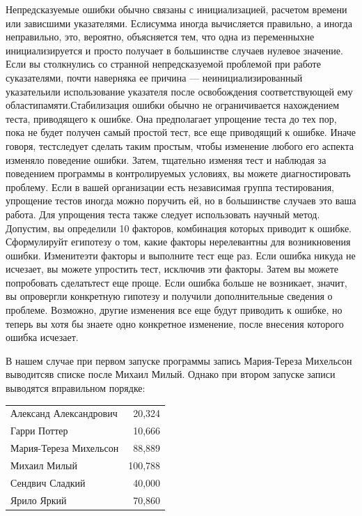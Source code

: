 \documentclass[a4paper]{article}
\begin{document}
Непредсказуемые ошибки обычно связаны с инициализацией,  расчетом  времени  или  зависшими  указателями.  Еслисумма  иногда  вычисляется  правильно,  а  иногда  неправильно, это, вероятно, объясняется тем, что одна из переменныхне  инициализируется  и  просто  получает  в  большинстве  случаев  нулевое  значение.  Если  вы  столкнулись  со  странной  непредсказуемой  проблемой  при  работе  суказателями,  почти  наверняка  ее  причина  —  неинициализированный  указательили  использование  указателя  после  освобождения  соответствующей  ему  областипамяти.Стабилизация  ошибки  обычно  не  ограничивается  нахождением  теста,  приводящего  к  ошибке.  Она  предполагает  упрощение  теста  до  тех  пор,  пока  не  будет  получен  самый  простой  тест,  все  еще  приводящий  к  ошибке.  Иначе  говоря,  тестследует  сделать  таким  простым,  чтобы  изменение  любого  его  аспекта  изменяло поведение  ошибки.  Затем,  тщательно  изменяя  тест  и  наблюдая  за  поведением программы  в  контролируемых  условиях,  вы  можете  диагностировать  проблему. Если  в  вашей  организации  есть  независимая  группа  тестирования,  упрощение тестов  иногда  можно  поручить  ей,  но  в  большинстве  случаев  это  ваша  работа. Для  упрощения  теста  также  следует  использовать  научный  метод.  Допустим,  вы определили 10 факторов, комбинация которых приводит к ошибке. Сформулируйт египотезу о том, какие факторы нерелевантны для возникновения ошибки. Изменитеэти  факторы  и  выполните  тест  еще  раз.  Если  ошибка  никуда  не  исчезает,  вы  можете  упростить  тест,  исключив  эти  факторы.  Затем  вы  можете  попробовать  сделатьтест  еще  проще.  Если  ошибка  больше  не  возникает,  значит,  вы  опровергли  конкретную  гипотезу  и  получили  дополнительные  сведения  о  проблеме.  Возможно, другие  изменения  все  еще  будут  приводить  к  ошибке,  но  теперь  вы  хотя  бы  знаете одно  конкретное  изменение,  после  внесения  которого  ошибка  исчезает.

В нашем случае при первом запуске программы запись Мария-Тереза Михельсон выводитсяв  списке  после  Михаил Милый.  Однако  при  втором  запуске  записи  выводятся  вправильном  порядке:

\begin{tabular}{lr}
Александ Александрович & 20,324 \\
Гарри Поттер               &   10,666 \\
Мария-Тереза Михельсон           &   88,889 \\
Михаил Милый           &  100,788 \\
Сендвич Сладкий      &   40,000 \\
Ярило Яркий           &   70,860 \\
\end{tabular}
\end{document}
